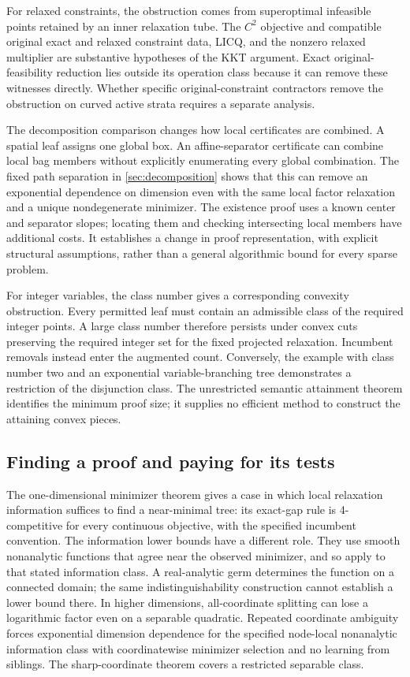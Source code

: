 For relaxed constraints, the obstruction comes from superoptimal infeasible
points retained by an inner relaxation tube. The $C^2$ objective and compatible original exact and relaxed constraint
data, LICQ, and the nonzero relaxed multiplier are substantive
hypotheses of the KKT argument. Exact original-feasibility reduction lies
outside its operation class because it can remove these witnesses directly.
Whether specific original-constraint contractors remove the obstruction on
curved active strata requires a separate analysis.

The decomposition comparison changes how local certificates are combined.
A spatial leaf assigns one global box. An affine-separator certificate can
combine local bag members without explicitly enumerating every global
combination. The fixed path separation in \cref{sec:decomposition} shows
that this can remove an exponential dependence on dimension even with the
same local factor relaxation and a unique nondegenerate minimizer. The
existence proof uses a known center and separator slopes; locating them and
checking intersecting local members have additional costs. It establishes a
change in proof representation, with explicit structural assumptions, rather
than a general algorithmic bound for every sparse problem.

For integer variables, the class number gives a corresponding convexity
obstruction. Every permitted leaf must contain an admissible class of the
required integer points. A large class number therefore persists under
convex cuts preserving the required integer set for the fixed projected
relaxation. Incumbent
removals instead enter the augmented count. Conversely, the example with
class number two and an exponential variable-branching tree demonstrates a
restriction of the disjunction class. The unrestricted semantic attainment
theorem identifies the minimum proof size; it supplies no efficient method
to construct the attaining convex pieces.

\subsection{Finding a proof and paying for its tests}\label{discussion:finding}

The one-dimensional minimizer theorem gives a case in which local relaxation
information suffices to find a near-minimal tree: its exact-gap rule is
4-competitive for every continuous objective, with the specified incumbent
convention. The information lower bounds have a different role. They use
smooth nonanalytic functions that agree near the observed minimizer, and so
apply to that stated information class. A real-analytic germ determines the
function on a connected domain; the same indistinguishability construction
cannot establish a lower bound there. In higher dimensions, all-coordinate splitting can lose a logarithmic
factor even on a separable quadratic. Repeated coordinate ambiguity forces
exponential dimension dependence for the specified node-local nonanalytic
information class with coordinatewise minimizer selection and no learning
from siblings. The sharp-coordinate theorem covers a restricted separable
class.

